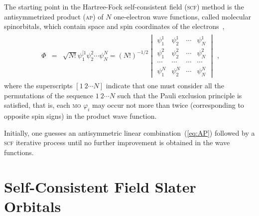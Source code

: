 The starting point in the Hartree-Fock self-consistent field
(\textsc{scf}) method is the antisymmetrized product (\textsc{ap}) of
$N$ one-electron wave functions, called molecular spinorbitals, which
contain space and spin coordinates of the
electrons~\cite{Roothaan_HF},
%
\begin{eqnarray}
  \begin{split}
    \Phi & = & \sqrt{N!}\psi_{1}^{[1} \psi_{2}^{2} \cdots \psi_{N}^{N} =
    (N!)^{-1/2}
    \begin{vmatrix}
      \psi_{1}^{1} & \psi_{2}^{1} & \cdots & \psi_{N}^{1} \\
      \psi_{1}^{2} & \psi_{2}^{2} & \cdots & \psi_{N}^{2} \\
      \cdots & \cdots & \cdots & \cdots \\
      \psi_{1}^{N} & \psi_{2}^{N} & \cdots & \psi_{N}^{N}
    \end{vmatrix}
  \end{split},
  \label{eq:AP}
\end{eqnarray}
%
where the superscripts $[1\ 2 \cdots N]$ indicate that one must
consider all the permutations of the sequence $1\ 2 \cdots N$ such
that the Pauli exclusion principle is satisfied, that is, each
\textsc{mo} $\varphi_{i}$ may occur not more than twice (corresponding
to opposite spin signs) in the product wave function.

Initially, one guesses an antisymmetric linear
combination~(\ref{eq:AP}) followed by a \textsc{scf} iterative process
until no further improvement is obtained in the wave functions.





\section{Self-Consistent Field Slater Orbitals}
\label{ch:scf_sto}





